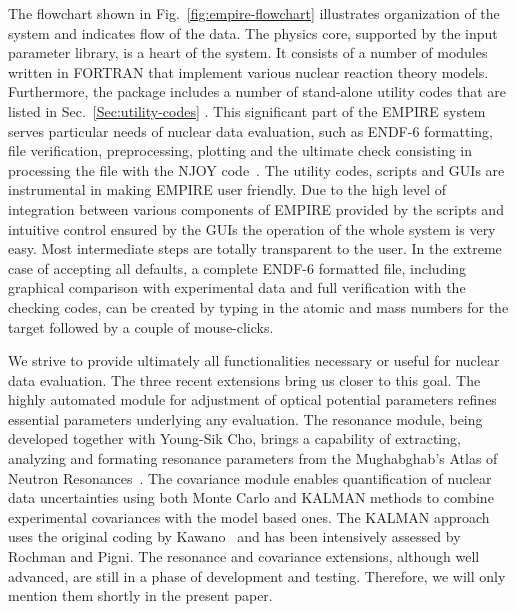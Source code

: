 The flowchart shown in Fig.~\ref{fig:empire-flowchart} illustrates
organization of the system and indicates flow of the data. The physics core,
supported by the input parameter library, is a heart of the system. It
consists of a number of modules written in FORTRAN that implement various
nuclear reaction theory models. Furthermore, the package includes a number
of stand-alone utility codes that are listed in Sec.~\ref{Sec:utility-codes}%
. This significant part of the EMPIRE system serves particular needs of
nuclear data evaluation, such as ENDF-6 formatting, file verification,
preprocessing, plotting and the ultimate check consisting in processing the
file with the NJOY code~\cite{MacFarlane:06,MacFarlane:94}. The utility
codes, scripts and GUIs are instrumental in making EMPIRE user friendly. Due
to the high level of integration between various components of EMPIRE
provided by the scripts and intuitive control ensured by the GUIs the
operation of the whole system is very easy. Most intermediate steps are
totally transparent to the user. In the extreme case of accepting all
defaults, a complete ENDF-6 formatted file, including graphical comparison
with experimental data and full verification with the checking codes, can be
created by typing in the atomic and mass numbers for the target followed by
a couple of mouse-clicks.

We strive to provide ultimately all functionalities necessary or useful for
nuclear data evaluation. The three recent extensions bring us closer to this
goal. The highly automated module for adjustment of optical potential
parameters refines essential parameters underlying any evaluation. The
resonance module, being developed together with Young-Sik Cho, brings a
capability of extracting, analyzing and formating resonance parameters from
the Mughabghab's Atlas of Neutron Resonances~\cite{Mughabghab:06}. The
covariance module enables quantification of nuclear data uncertainties using
both Monte Carlo and KALMAN methods to combine experimental covariances with
the model based ones. The KALMAN approach uses the original coding by Kawano~%
\cite{Kawano:97} and has been intensively assessed by Rochman and Pigni. The
resonance and covariance extensions, although well advanced, are still in a
phase of development and testing. Therefore, we will only mention them
shortly in the present paper.

